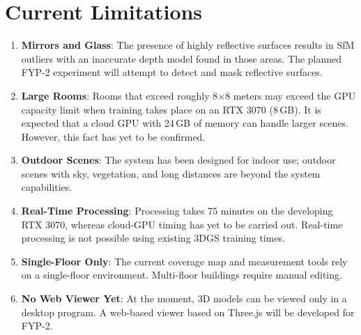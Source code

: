 \section{Current Limitations}
\begin{enumerate}
    \item \textbf{Mirrors and Glass}: The presence of highly reflective surfaces results in SfM outliers with an inaccurate depth model found in those areas. The planned FYP-2 experiment will attempt to detect and mask reflective surfaces.
    \item \textbf{Large Rooms}: Rooms that exceed roughly 8$\times$8 meters may exceed the GPU capacity limit when training takes place on an RTX 3070 (8\,GB). It is expected that a cloud GPU with 24\,GB of memory can handle larger scenes. However, this fact has yet to be confirmed.
    \item \textbf{Outdoor Scenes}: The system has been designed for indoor use; outdoor scenes with sky, vegetation, and long distances are beyond the system capabilities.
    \item \textbf{Real-Time Processing}: Processing takes 75 minutes on the developing RTX 3070, whereas cloud-GPU timing has yet to be carried out. Real-time processing is not possible using existing 3DGS training times.
    \item \textbf{Single-Floor Only}: The current coverage map and measurement tools rely on a single-floor environment. Multi-floor buildings require manual editing.
    \item \textbf{No Web Viewer Yet}: At the moment, 3D models can be viewed only in a desktop program. A web-based viewer based on Three.js will be developed for FYP-2.
\end{enumerate}
